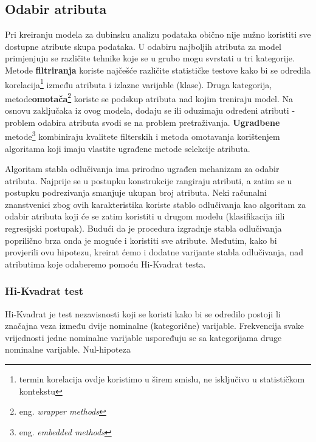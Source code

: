 \subsection{Odabir atributa}
Pri kreiranju modela za dubinsku analizu podataka obično nije nužno koristiti sve dostupne atribute skupa podataka. U odabiru najboljih atributa za model primjenjuju se različite tehnike koje se u grubo mogu svrstati u tri kategorije. Metode \textbf{filtriranja} koriste najčešće različite statističke testove kako bi se odredila korelacija\footnote{termin korelacija ovdje koristimo u širem smislu, ne isključivo u statističkom kontekstu} između atributa i izlazne varijable (klase). Druga kategorija, metode\textbf{omotača}\footnote{eng. \textit{wrapper methods}} koriste se podskup atributa nad kojim treniraju model. Na osnovu zaključaka iz ovog modela, dodaju se ili oduzimaju određeni atributi - problem odabira atributa svodi se na problem pretraživanja. \textbf{Ugradbene} metode\footnote{eng. \textit{embedded methods}} kombiniraju kvalitete filterskih i metoda omotavanja korištenjem algoritama koji imaju vlastite ugrađene metode selekcije atributa.

Algoritam stabla odlučivanja ima prirodno ugrađen mehanizam za odabir atributa. Najprije se u postupku konstrukcije rangiraju atributi, a zatim se u postupku podrezivanja smanjuje ukupan broj atributa. Neki računalni znanstvenici\cite{Grabczewski01} zbog ovih karakteristika koriste stablo odlučivanja kao algoritam za odabir atributa koji će se zatim koristiti u drugom modelu (klasifikacija iili regresijski postupak). Budući da je procedura izgradnje stabla odlučivanja poprilično brza onda je moguće i koristiti sve atribute. Međutim, kako bi provjerili ovu hipotezu, kreirat ćemo i dodatne varijante stabla odlučivanja, nad atributima koje odaberemo pomoću Hi-Kvadrat testa.
\subsubsection{Hi-Kvadrat test}
Hi-Kvadrat je test nezavisnosti koji se koristi kako bi se odredilo postoji li značajna veza između dvije nominalne (kategorične) varijable. Frekvencija svake vrijednosti jedne nominalne varijable uspoređuju se sa kategorijama druge nominalne varijable. Nul-hipoteza 

